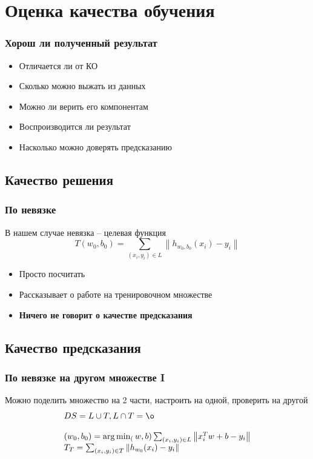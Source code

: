 \documentclass[14pt, fleqn, xcolor={dvipsnames, table}, hyperref={unicode}, babel={english,russian}, inputenc=utf8x]{beamer}
\begin{document}
\section{Оценка качества обучения}
\begin{frame}[t]\frametitle{Хорош ли полученный результат}
\begin{itemize}
  \item Отличается ли от КО
  \item Сколько можно выжать из данных
  \item Можно ли верить его компонентам
  \item Воспроизводится ли результат
  \item Насколько можно доверять предсказанию
\end{itemize}
\end{frame}

\subsection{Качество решения}
\begin{frame}[t]\frametitle{По невязке}
В нашем случае невязка -- целевая функция
$$
T(w_0,b_0) = \sum_{(x_i,y_i) \in L} \left\| h_{w_0,b_0}(x_i) - y_i \right\|
$$
\begin{itemize}
  \item Просто посчитать
  \item Рассказывает о работе на тренировочном множестве
  \item {\bf Ничего не говорит о качестве предсказания}
\end{itemize}
\end{frame}

\subsection{Качество предсказания}

\begin{frame}[t]\frametitle{По невязке на другом множестве I}
Можно поделить множество на 2 части, настроить на одной, проверить на другой
$$
  \begin{array}{ll}
    DS = L \cup T, L \cap T = \o \\
    \\
    (w_0,b_0) = \arg\min_(w,b) \sum_{(x_i,y_i) \in L} \left\| x_i^Tw + b - y_i \right\| \\
    T_T = \sum_{(x_i,y_i) \in T} \left\| h_{w_0}(x_i) - y_i \right\|
  \end{array}
$$
\end{frame}
\end{document}
